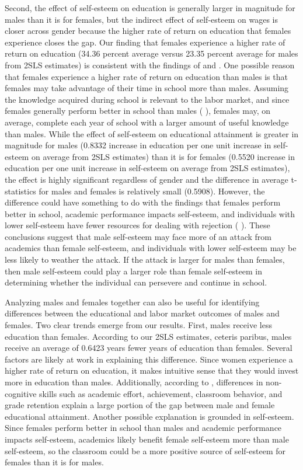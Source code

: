 \documentclass[12pt]{report}
\newcommand{\citee}[1]{\citename{#1} \citeyear{#1}}
\begin{document}
Second, the effect of self-esteem on education is generally larger in magnitude for males than it is for females, but the indirect effect of self-esteem on wages is closer across gender because the higher rate of return on education that females experience closes the gap. Our finding that females experience a higher rate of return on education (34.36 percent average versus 23.35 percent average for males from 2SLS estimates) is consistent with the findings of \citee{P1994} and \citee{J2002}. One possible reason that females experience a higher rate of return on education than males is that females may take advantage of their time in school more than males. Assuming the knowledge acquired during school is relevant to the labor market, and since females generally perform better in school than males (\citee{J2002}), females may, on average, complete each year of school with a larger amount of useful knowledge than males. While the effect of self-esteem on educational attainment is greater in magnitude for males (0.8332 increase in education per one unit increase in self-esteem on average from 2SLS estimates) than it is for females (0.5520 increase in education per one unit increase in self-esteem on average from 2SLS estimates), the effect is highly significant regardless of gender and the difference in average t-statistics for males and females is relatively small (0.5908). However, the difference could have something to do with the findings that females perform better in school, academic performance impacts self-esteem, and individuals with lower self-esteem have fewer resources for dealing with rejection (\citee{SB2002}). These conclusions suggest that male self-esteem may face more of an attack from academics than female self-esteem, and individuals with lower self-esteem may be less likely to weather the attack. If the attack is larger for males than females, then male self-esteem could play a larger role than female self-esteem in determining whether the individual can persevere and continue in school.

Analyzing males and females together can also be useful for identifying differences between the educational and labor market outcomes of males and females. Two clear trends emerge from our results. First, males receive less education than females. According to our 2SLS estimates, ceteris paribus, males receive an average of 0.6423 years fewer years of education than females. Several factors are likely at work in explaining this difference. Since women experience a higher rate of return on education, it makes intuitive sense that they would invest more in education than males. Additionally, according to \citee{J2002}, differences in non-cognitive skills such as academic effort, achievement, classroom behavior, and grade retention explain a large portion of the gap between male and female educational attainment. Another possible explanation is grounded in self-esteem. Since females perform better in school than males and academic performance impacts self-esteem, academics likely benefit female self-esteem more than male self-esteem, so the classroom could be a more positive source of self-esteem for females than it is for males.
\end{document}
